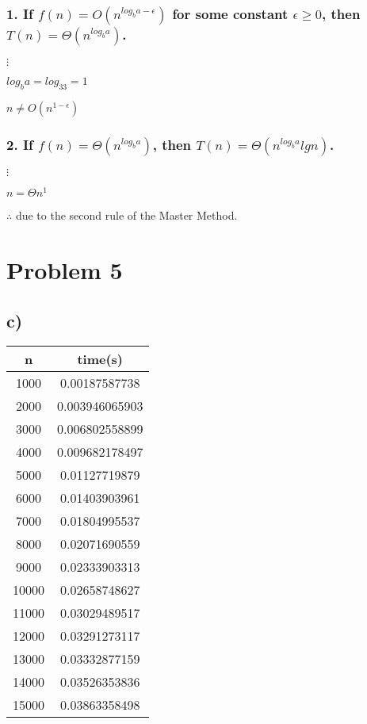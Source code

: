 \documentclass{article}
\begin{document}
\subsubsection*{1. If $f(n) = O(n^{log_ba - \epsilon})$ for some constant $\epsilon \geq  0$, then $T(n) = \Theta(n^{log_ba})$.}

$\vdots$

$log_ba = log_33 = 1$

$n \neq O(n^{1 - \epsilon})$

\subsubsection*{2. If $f(n) = \Theta(n^{log_ba})$, then $T(n) = \Theta(n^{log_ba}lgn)$.}

$\vdots$

$n = \Theta n^1$

$\therefore$  due to the second rule of the Master Method.

\section*{Problem 5}

\subsection*{c)}

    \begin{center}
        \begin{tabular}{||c c||} 
        \hline
        n & time(s) \\ [0.5ex] 
        \hline\hline
        1000 & 0.00187587738 \\
        \hline
        2000 & 0.003946065903 \\
        \hline
        3000 & 0.006802558899 \\
        \hline
        4000 & 0.009682178497 \\
        \hline
        5000 & 0.01127719879 \\
        \hline
        6000 & 0.01403903961 \\
        \hline
        7000 & 0.01804995537 \\
        \hline
        8000 & 0.02071690559 \\
        \hline
        9000 & 0.02333903313 \\
        \hline
        10000 & 0.02658748627 \\
        \hline
        11000 & 0.03029489517 \\
        \hline
        12000 & 0.03291273117 \\
        \hline
        13000 & 0.03332877159 \\
        \hline
        14000 & 0.03526353836 \\
        \hline
        15000 & 0.03863358498 \\
        \hline
        \end{tabular}
    \end{center}
    
\end{document}
